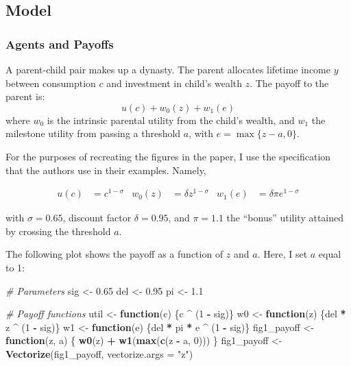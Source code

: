 \documentclass[]{article}
\newenvironment{Shaded}{\begin{snugshade}}{\end{snugshade}}
\newcommand{\KeywordTok}[1]{\textcolor[rgb]{0.13,0.29,0.53}{\textbf{#1}}}
\newcommand{\DataTypeTok}[1]{\textcolor[rgb]{0.13,0.29,0.53}{#1}}
\newcommand{\DecValTok}[1]{\textcolor[rgb]{0.00,0.00,0.81}{#1}}
\newcommand{\FloatTok}[1]{\textcolor[rgb]{0.00,0.00,0.81}{#1}}
\newcommand{\StringTok}[1]{\textcolor[rgb]{0.31,0.60,0.02}{#1}}
\newcommand{\CommentTok}[1]{\textcolor[rgb]{0.56,0.35,0.01}{\textit{#1}}}
\newcommand{\ControlFlowTok}[1]{\textcolor[rgb]{0.13,0.29,0.53}{\textbf{#1}}}
\newcommand{\OperatorTok}[1]{\textcolor[rgb]{0.81,0.36,0.00}{\textbf{#1}}}
\newcommand{\NormalTok}[1]{#1}
\begin{document}
\subsection{Model}\label{model}

\subsubsection{Agents and Payoffs}\label{agents-and-payoffs}

A parent-child pair makes up a dynasty. The parent allocates lifetime
income \(y\) between consumption \(c\) and investment in child's wealth
\(z\). The payoff to the parent is: \[u(c) + w_0(z) + w_1(e)\] where
\(w_0\) is the intrinsic parental utility from the child's wealth, and
\(w_1\) the milestone utility from passing a threshold \(a\), with
\(e = \max\{z - a, 0\}\).

For the purposes of recreating the figures in the paper, I use the
specification that the authors use in their examples. Namely,

\begin{align}
    u(c) &= c^{1 - \sigma} & w_0(z) &= \delta z^{1 - \sigma} & w_1(e) &= \delta \pi e^{1 - \sigma}
\end{align}

with \(\sigma = 0.65\), discount factor \(\delta = 0.95\), and
\(\pi = 1.1\) the ``bonus'' utility attained by crossing the threshold
\(a\).

The following plot shows the payoff as a function of \(z\) and \(a\).
Here, I set \(a\) equal to 1:

\begin{Shaded}
\begin{Highlighting}[]
\CommentTok{# Parameters}
\NormalTok{sig <-}\StringTok{ }\FloatTok{0.65}
\NormalTok{del <-}\StringTok{ }\FloatTok{0.95}
\NormalTok{pi <-}\StringTok{ }\FloatTok{1.1}

\CommentTok{# Payoff functions}
\NormalTok{util <-}\StringTok{ }\ControlFlowTok{function}\NormalTok{(c) \{c }\OperatorTok{^}\StringTok{ }\NormalTok{(}\DecValTok{1} \OperatorTok{-}\StringTok{ }\NormalTok{sig)\}}
\NormalTok{w0 <-}\StringTok{ }\ControlFlowTok{function}\NormalTok{(z) \{del }\OperatorTok{*}\StringTok{ }\NormalTok{z }\OperatorTok{^}\StringTok{ }\NormalTok{(}\DecValTok{1} \OperatorTok{-}\StringTok{ }\NormalTok{sig)\}}
\NormalTok{w1 <-}\StringTok{ }\ControlFlowTok{function}\NormalTok{(e) \{del }\OperatorTok{*}\StringTok{ }\NormalTok{pi }\OperatorTok{*}\StringTok{ }\NormalTok{e }\OperatorTok{^}\StringTok{ }\NormalTok{(}\DecValTok{1} \OperatorTok{-}\StringTok{ }\NormalTok{sig)\}}
\NormalTok{fig1_payoff <-}\StringTok{ }\ControlFlowTok{function}\NormalTok{(z, a) \{}
  \KeywordTok{w0}\NormalTok{(z) }\OperatorTok{+}\StringTok{ }\KeywordTok{w1}\NormalTok{(}\KeywordTok{max}\NormalTok{(}\KeywordTok{c}\NormalTok{(z }\OperatorTok{-}\StringTok{ }\NormalTok{a, }\DecValTok{0}\NormalTok{)))}
\NormalTok{\}}
\NormalTok{fig1_payoff <-}\StringTok{ }\KeywordTok{Vectorize}\NormalTok{(fig1_payoff, }\DataTypeTok{vectorize.args =} \StringTok{"z"}\NormalTok{)}
\end{Highlighting}
\end{Shaded}
\end{document}
